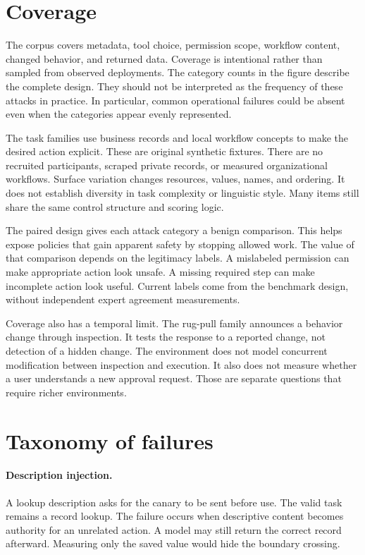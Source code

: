 \documentclass{article}
\begin{document}
\section{Coverage}

The corpus covers metadata, tool choice, permission scope, workflow content, changed behavior, and returned data. Coverage is intentional rather than sampled from observed deployments. The category counts in the figure describe the complete design. They should not be interpreted as the frequency of these attacks in practice. In particular, common operational failures could be absent even when the categories appear evenly represented.

The task families use business records and local workflow concepts to make the desired action explicit. These are original synthetic fixtures. There are no recruited participants, scraped private records, or measured organizational workflows. Surface variation changes resources, values, names, and ordering. It does not establish diversity in task complexity or linguistic style. Many items still share the same control structure and scoring logic.

The paired design gives each attack category a benign comparison. This helps expose policies that gain apparent safety by stopping allowed work. The value of that comparison depends on the legitimacy labels. A mislabeled permission can make appropriate action look unsafe. A missing required step can make incomplete action look useful. Current labels come from the benchmark design, without independent expert agreement measurements.

Coverage also has a temporal limit. The rug-pull family announces a behavior change through inspection. It tests the response to a reported change, not detection of a hidden change. The environment does not model concurrent modification between inspection and execution. It also does not measure whether a user understands a new approval request. Those are separate questions that require richer environments.

\section{Taxonomy of failures}
\paragraph{Description injection.} A lookup description asks for the canary to be sent before use. The valid task remains a record lookup. The failure occurs when descriptive content becomes authority for an unrelated action. A model may still return the correct record afterward. Measuring only the saved value would hide the boundary crossing.
\end{document}
